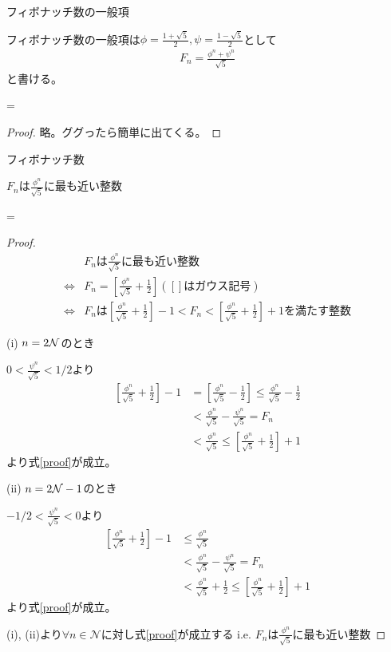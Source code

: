 \documentclass[a4paper,11pt]{jsarticle}
\newcommand{\EndIt}{}
\newenvironment{barred}[2][]{%
  \renewcommand{\EndIt}{\end{#2}}%
  \begin{#2}#1\noindent\newline
  \begin{lrbox}{\probbox}%
  \addtolength{\linewidth}{-12pt}%
  \begin{minipage}[t]{\linewidth}%
  \nointerlineskip
}{%
  \par
  \xdef\ResetDepth{\prevdepth=\the\prevdepth\relax}%
  \unskip\unskip\unpenalty
  \end{minipage}%
  \end{lrbox}%
  \noindent
  \makebox[\columnwidth]{%
    \hfill\vrule\hspace{2pt}\vrule\hfill
    \usebox{\probbox}}%
  \EndIt
  \ResetDepth
}
\begin{document}
\begin{barred}[フィボナッチ数の一般項]{Prop}
フィボナッチ数の一般項は$\phi = \frac{1 + \sqrt{5}}{2}, \psi = \frac{1 - \sqrt{5}}{2}$として
\begin{align}
F_n = \frac{\phi^n + \psi^n}{\sqrt{5}}
\end{align}
と書ける。
\end{barred}
\begin{proof}
略。ググったら簡単に出てくる。
\end{proof}

\begin{barred}[フィボナッチ数]{Prop}
$F_n$は$\frac{\phi^n}{\sqrt{5}}$に最も近い整数
\end{barred}

\begin{proof}
\begin{align}
&F_nは\frac{\phi^n}{\sqrt{5}}に最も近い整数\\
\Leftrightarrow& F_n = \left[ \frac{\phi^n}{\sqrt{5}} + \frac{1}{2} \right] ( [] はガウス記号 ) \\
\Leftrightarrow& F_n は \left[ \frac{\phi^n}{\sqrt{5}} + \frac{1}{2} \right] -1 < F_n < \left[ \frac{\phi^n}{\sqrt{5}} + \frac{1}{2} \right] + 1 を満たす整数
\label{proof}
\end{align}

(i) $n = 2\bold{\mathcal{N}}$のとき

$0<\frac{\psi^n}{\sqrt{5}}<1/2$より
\begin{align}
\left[ \frac{\phi^n}{\sqrt{5}} + \frac{1}{2} \right] -1
 &= \left[ \frac{\phi^n}{\sqrt{5}} - \frac{1}{2} \right]
 \le \frac{\phi^n}{\sqrt{5}} - \frac{1}{2} \\
 &< \frac{\phi^n}{\sqrt{5}} - \frac{\psi^n}{\sqrt{5}} = F_n\\
 &< \frac{\phi^n}{\sqrt{5}}
 \le \left[ \frac{\phi^n}{\sqrt{5}} + \frac{1}{2} \right] + 1
\end{align}
より式\eqref{proof}が成立。

(ii) $n = 2\bold{\mathcal{N}} - 1$のとき

$-1/2<\frac{\psi^n}{\sqrt{5}}<0$より
\begin{align}
\left[ \frac{\phi^n}{\sqrt{5}} + \frac{1}{2} \right] -1
 &\le \frac{\phi^n}{\sqrt{5}} \\
 &< \frac{\phi^n}{\sqrt{5}} - \frac{\psi^n}{\sqrt{5}} = F_n\\
 &< \frac{\phi^n}{\sqrt{5}} + \frac{1}{2}
 \le \left[ \frac{\phi^n}{\sqrt{5}} + \frac{1}{2} \right] + 1
\end{align}
より式\eqref{proof}が成立。

(i), (ii)より$\forall n \in \mathcal{N}$に対し式\eqref{proof}が成立する i.e. $F_n$は$\frac{\phi^n}{\sqrt{5}}$に最も近い整数
\end{proof}
\end{document}
